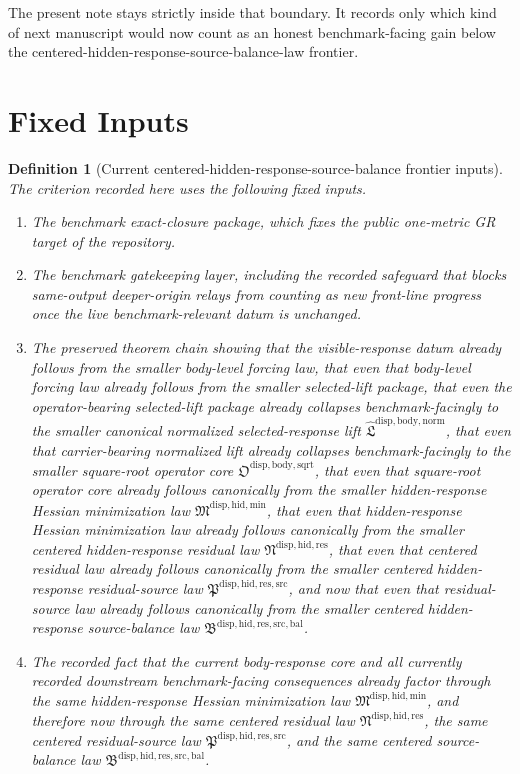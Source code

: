 \documentclass[11pt]{article}
\newcommand{\SourceBalanceLawPackage}{\mathfrak B^{\mathrm{disp,hid,res,src,bal}}}
\newcommand{\ResidualSourceLawPackage}{\mathfrak P^{\mathrm{disp,hid,res,src}}}
\newcommand{\ResidualLawPackage}{\mathfrak N^{\mathrm{disp,hid,res}}}
\newcommand{\HiddenMinimizationPackage}{\mathfrak M^{\mathrm{disp,hid,min}}}
\newcommand{\SquareRootOperatorCore}{\mathfrak O^{\mathrm{disp,body,sqrt}}}
\newcommand{\NormalizedLiftPackage}{\widehat{\mathfrak L}^{\mathrm{disp,body,norm}}}
\newtheorem{definition}{Definition}
\begin{document}
The present note stays strictly inside that boundary. It records only which kind of next manuscript would now count as an honest benchmark-facing gain below the centered-hidden-response-source-balance-law frontier.

\section{Fixed Inputs}

\begin{definition}[Current centered-hidden-response-source-balance frontier inputs]
The criterion recorded here uses the following fixed inputs.
\begin{enumerate}
    \item The benchmark exact-closure package, which fixes the public one-metric GR target of the repository.
    \item The benchmark gatekeeping layer, including the recorded safeguard that blocks same-output deeper-origin relays from counting as new front-line progress once the live benchmark-relevant datum is unchanged.
    \item The preserved theorem chain showing that the visible-response datum already follows from the smaller body-level forcing law, that even that body-level forcing law already follows from the smaller selected-lift package, that even the operator-bearing selected-lift package already collapses benchmark-facingly to the smaller canonical normalized selected-response lift \(\NormalizedLiftPackage\), that even that carrier-bearing normalized lift already collapses benchmark-facingly to the smaller square-root operator core \(\SquareRootOperatorCore\), that even that square-root operator core already follows canonically from the smaller hidden-response Hessian minimization law \(\HiddenMinimizationPackage\), that even that hidden-response Hessian minimization law already follows canonically from the smaller centered hidden-response residual law \(\ResidualLawPackage\), that even that centered residual law already follows canonically from the smaller centered hidden-response residual-source law \(\ResidualSourceLawPackage\), and now that even that residual-source law already follows canonically from the smaller centered hidden-response source-balance law \(\SourceBalanceLawPackage\).
    \item The recorded fact that the current body-response core and all currently recorded downstream benchmark-facing consequences already factor through the same hidden-response Hessian minimization law \(\HiddenMinimizationPackage\), and therefore now through the same centered residual law \(\ResidualLawPackage\), the same centered residual-source law \(\ResidualSourceLawPackage\), and the same centered source-balance law \(\SourceBalanceLawPackage\).
\end{enumerate}
\end{definition}
\end{document}
